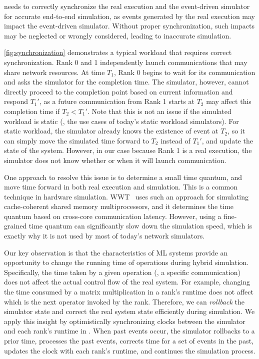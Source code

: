 \sys needs to correctly synchronize the real execution and the event-driven simulator for accurate end-to-end simulation, as events generated by the real execution may impact the event-driven simulator. Without proper synchronization, such impacts may be neglected or wrongly considered, leading to inaccurate simulation. 

\autoref{fig:synchronization} demonstrates a typical workload that requires correct synchronization. 
Rank 0 and 1 independently launch communications that may share network resources. At time $T_1$, Rank 0 begins to wait for its communication and asks the simulator for the completion time. The simulator, however, cannot directly proceed to the completion point based on current information and respond $T_1'$, as a future communication from Rank 1 starts at $T_2$ may affect this completion time if $T_2 < T_1'$. Note that this is not an issue if the simulated workload is static (\eg, the use cases of today's static workload simulators). For static workload, the simulator already knows the existence of event at $T_2$, so it can simply move the simulated time forward to $T_2$ instead of $T_1'$, and update the state of the system. However, in our case because Rank 1 is a real execution, the simulator does not know whether or when it will launch communication.


One approach to resolve this issue is to determine a small time quantum, and move time forward in both real execution and simulation. This is a common technique in hardware simulation. WWT~\cite{reinhardt1993wwt} uses such an approach for simulating cache-coherent shared memory multiprocessors, and it determines the time quantum based on cross-core communication latency. However, using a fine-grained time quantum can significantly slow down the simulation speed, which is exactly why it is not used by most of today's network simulators.

Our key observation is that the characteristics of ML systems provide an opportunity to change the running time of operations during hybrid simulation. Specifically, the time taken by a given operation (\eg, a specific communication) does not affect the actual control flow of the real system. For example, changing the time consumed by a matrix multiplication in a rank's runtime does not affect which is the next operator invoked by the rank. Therefore, we can \emph{rollback} the simulator state and correct the real system state efficiently during simulation.
We apply this insight by optimistically synchronizing clocks between the simulator and each rank's runtime in \sys. When past events occur, the simulator rollbacks to a prior time, processes the past events, corrects time for a set of events in the past, updates the clock with each rank's runtime, and continues the simulation process.

